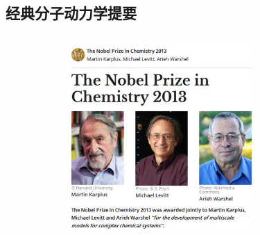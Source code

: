 \subsection{经典分子动力学提要}
\frame
{
	\frametitle{}
\begin{figure}[h!]
\centering
\vspace{-7.0pt}
\includegraphics[height=2.85in,width=3.80in,viewport=0 0 410 300,clip]{Figures/Nobel_Prize_Chemistry-2013.jpg}
\label{Nobel-Prize-Chemistry_2013}
\end{figure}
}

